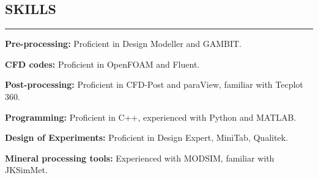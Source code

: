 \documentclass[10pt,a4]{article}
\begin{document}
\begin{small}

\subsection*{SKILLS}
\hrule
\vspace{0.2cm}
\begin{list}{}{}
	\item \textbf{Pre-processing:} Proficient in Design Modeller and GAMBIT.
	\item \textbf{CFD codes:} Proficient in OpenFOAM and Fluent.
	\item \textbf{Post-processing:} Proficient in CFD-Post and paraView, familiar with Tecplot 360.	
	\item \textbf{Programming:} Proficient in C++, experienced with Python and MATLAB.
    \item \textbf{Design of Experiments:} Proficient in Design Expert, MiniTab, Qualitek.
    \item \textbf{Mineral processing tools:} Experienced with MODSIM, familiar with JKSimMet.
\end{list}










\end{small}
\end{document}
